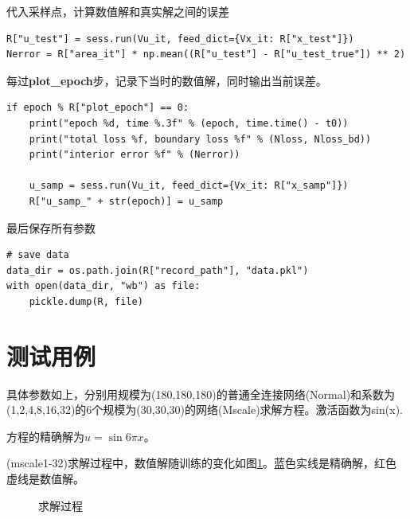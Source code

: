 \documentclass[12pt,a4paper]{article}
\begin{document}
代入采样点，计算数值解和真实解之间的误差
\begin{lstlisting}
R["u_test"] = sess.run(Vu_it, feed_dict={Vx_it: R["x_test"]})
Nerror = R["area_it"] * np.mean((R["u_test"] - R["u_test_true"]) ** 2)
\end{lstlisting}

每过\textbf{plot\_epoch}步，记录下当时的数值解，同时输出当前误差。
\begin{lstlisting}
if epoch % R["plot_epoch"] == 0:
    print("epoch %d, time %.3f" % (epoch, time.time() - t0))
    print("total loss %f, boundary loss %f" % (Nloss, Nloss_bd))
    print("interior error %f" % (Nerror))

    u_samp = sess.run(Vu_it, feed_dict={Vx_it: R["x_samp"]})
    R["u_samp_" + str(epoch)] = u_samp
\end{lstlisting}

最后保存所有参数
\begin{lstlisting}
# save data
data_dir = os.path.join(R["record_path"], "data.pkl")
with open(data_dir, "wb") as file:
    pickle.dump(R, file)
\end{lstlisting}

\section*{测试用例}

具体参数如上，分别用规模为(180,180,180)的普通全连接网络(Normal)和系数为(1,2,4,8,16,32)的6个规模为(30,30,30)的网络(Mscale)求解方程。激活函数为sin(x).

方程的精确解为$u = \sin 6 \pi x$。

(mscale1-32)求解过程中，数值解随训练的变化如图\ref{proc}。蓝色实线是精确解，红色虚线是数值解。
\begin{figure}[h]
\centering
{}
\caption{求解过程}
\label{proc}
\end{figure}
\end{document}
